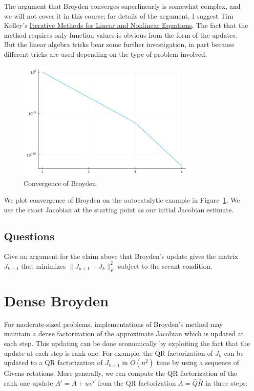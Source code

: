 \documentclass[12pt, leqno]{article} %
\begin{document}
The argument that Broyden converges superlinearly is somewhat complex,
and we will not cover it in this course; for details of the argument, I
suggest Tim Kelley's
\href{https://doi.org/10.1137/1.9781611970944}{Iterative Methods for
Linear and Nonlinear Equations}. The fact that the method requires only
function values is obvious from the form of the updates. But the linear
algebra tricks bear some further investigation, in part because
different tricks are used depending on the type of problem involved.

\begin{figure}
\begin{center}
  \includegraphics[width=0.8\textwidth]{fig/2023-04-14-broyden-cvg.pdf}
\end{center}
\caption{Convergence of Broyden.}
\label{fig:broyden-cvg}
\end{figure}

We plot convergence of Broyden on the autocatalytic example in
Figure~\ref{fig:broyden-cvg}.  We use the exact Jacobian at the
starting point as our initial Jacobian estimate.

\subsection{Questions}

Give an argument for the claim above that Broyden's update gives the
matrix \(J_{k+1}\) that minimizes \(\|J_{k+1}-J_k\|_F^2\) subject to the
secant condition.

\section{Dense Broyden}

For moderate-sized problems, implementations of Broyden's method may
maintain a dense factorization of the approximate Jacobian which is
updated at each step. This updating can be done economically by
exploiting the fact that the update at each step is rank one. For
example, the QR factorization of \(J_k\) can be updated to a QR
factorization of \(J_{k+1}\) in \(O(n^2)\) time by using a sequence of
Givens rotations. More generally, we can compute the QR factorization of
the rank one update \(A' = A+uv^T\) from the QR factorization
\(A = \bar{Q} \bar{R}\) in three steps:
\end{document}
